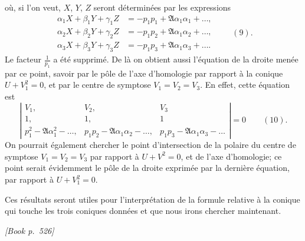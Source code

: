 \documentclass[11pt]{article}
\begin{document}
o\`u, si l'on veut, $X$, $Y$, $Z$ seront d\'etermin\'ees par les expressions
\[
\begin{aligned}
\alpha_{1} X + \beta_{1} Y + \gamma_{1} Z &= -p_{1}p_{1} + \mathfrak{A}\alpha_{1}\alpha_{1} + \dots,\\
\alpha_{2} X + \beta_{2} Y + \gamma_{2} Z &= -p_{1}p_{2} + \mathfrak{A}\alpha_{1}\alpha_{2} + \dots,\\
\alpha_{3} X + \beta_{3} Y + \gamma_{3} Z &= -p_{1}p_{3} + \mathfrak{A}\alpha_{1}\alpha_{3} + \dots.
\end{aligned} \qquad (9).
\]
Le facteur $\tfrac{1}{p_{1}}$ a \'et\'e supprim\'e. De l\`a on obtient aussi l'\'equation de la droite men\'ee par ce point, savoir par le p\^ole de l'axe d'homologie par rapport \`a la conique $U + V_{1}^{2} = 0$, et par le centre de symptose $V_{1} = V_{2} = V_{3}$. En effet, cette \'equation est
\[
\left|\begin{array}{ccc}
V_{1}, & V_{2}, & V_{3} \\
1, & 1, & 1 \\
p_{1}^{2} - \mathfrak{A}\alpha_{1}^{2} - \dots, & p_{1}p_{2} - \mathfrak{A}\alpha_{1}\alpha_{2} - \dots, & p_{1}p_{3} - \mathfrak{A}\alpha_{1}\alpha_{3} - \dots
\end{array}\right| = 0 \qquad (10).
\]
On pourrait \'egalement chercher le point d'intersection de la polaire du centre de symptose $V_{1} = V_{2} = V_{3}$ par rapport \`a $U + V^{2} = 0$, et de l'axe d'homologie; ce point serait \'evidemment le p\^ole de la droite exprim\'ee par la derni\`ere \'equation, par rapport \`a $U + V_{1}^{2} = 0$.

Ces r\'esultats seront utiles pour l'interpr\'etation de la formule relative \`a la conique qui touche les trois coniques donn\'ees et que nous irons chercher maintenant.

\medskip
\noindent\textit{[Book p.~526]}\hfill

\smallskip
\end{document}
